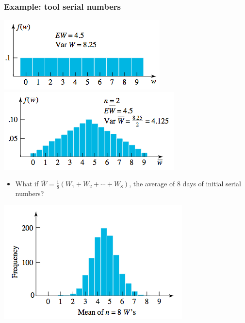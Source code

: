 \documentclass[handout]{beamer}\usepackage{graphicx, color}
\providecommand{\ov}[1]{\overline{#1}}
\numberwithin{equation}{section}
\begin{document}
\begin{frame}
\frametitle{Example: tool serial numbers}
 \includegraphics{../../fig/wbar1.png}
 \includegraphics{../../fig/wbar2.png}
\begin{itemize}
\item What if $\ov{W} = \frac{1}{8}(W_1 + W_2 + \cdots + W_8)$, the average of 8 days of initial serial numbers?
\end{itemize}
 \includegraphics{../../fig/wbar8.png}
\end{frame}
\end{document}
